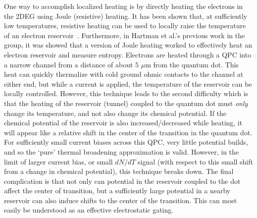 One way to accomplish localized heating is by directly heating the electrons in the \ac{2DEG} using Joule (resistive) heating. It has been shown that, at sufficiently low temperatures, resistive heating can be used to locally raise the temperature of an electron reservoir~\cite{mittal1996electron}. Furthermore, in Hartman et al.'s previous work in the group, it was showed that a version of Joule heating worked to effectively heat an electron reservoir and measure entropy. Electrons are heated through a \ac{QPC} into a narrow channel from a distance of about 5 $\mu$m from the quantum dot. This heat can quickly thermalize with cold ground ohmic contacts to the channel at either end, but while a current is applied, the temperature of the reservoir can be locally controlled. However, this technique leads to the second difficulty which is that the heating of the reservoir (tunnel) coupled to the quantum dot must \textit{only} change its temperature, and not also change its chemical potential. If the chemical potential of the reservoir is also increased/decreased while heating, it will appear like a relative shift in the center of the transition in the quantum dot. For sufficiently small current biases across this \ac{QPC}, very little potential builds, and so the `pure' thermal broadening approximation is valid. However, in the limit of larger current bias, or small $dN/dT$ signal (with respect to this small shift from a change in chemical potential), this technique breaks down. The final complication is that not only can potential in the reservoir coupled to the dot affect the center of transition, but a sufficiently large potential in a nearby reservoir can also induce shifts to the center of the transition. This can most easily be understood as an effective electrostatic gating. 

